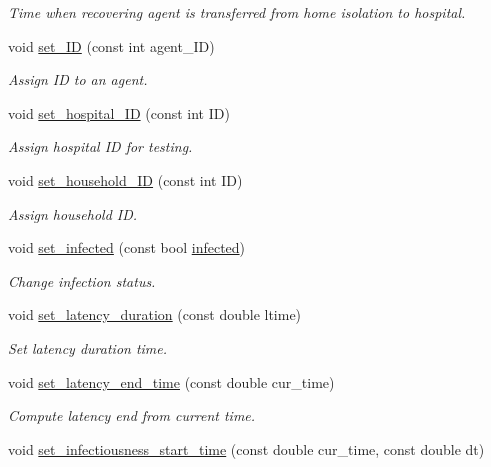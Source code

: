 \begin{DoxyCompactItemize}
\begin{DoxyCompactList}\small\item\em Time when recovering agent is transferred from home isolation to hospital. \end{DoxyCompactList}\item 
void \hyperlink{classAgent_a2820049e7b8d498e5fb5047ca2a05d63}{set\+\_\+\+ID} (const int agent\+\_\+\+ID)
\begin{DoxyCompactList}\small\item\em Assign ID to an agent. \end{DoxyCompactList}\item 
void \hyperlink{classAgent_acd018fbc754c1a7a6b2a8cdf05455c6c}{set\+\_\+hospital\+\_\+\+ID} (const int ID)
\begin{DoxyCompactList}\small\item\em Assign hospital ID for testing. \end{DoxyCompactList}\item 
void \hyperlink{classAgent_a2b889b74bbe8a1c8754c3211892a761b}{set\+\_\+household\+\_\+\+ID} (const int ID)
\begin{DoxyCompactList}\small\item\em Assign household ID. \end{DoxyCompactList}\item 
void \hyperlink{classAgent_a97a65be4ac76ba2650f8e4ea136dc3d7}{set\+\_\+infected} (const bool \hyperlink{classAgent_abb85f9353fdaa27e69606b3c1e8fa364}{infected})
\begin{DoxyCompactList}\small\item\em Change infection status. \end{DoxyCompactList}\item 
void \hyperlink{classAgent_a3f8ddc8e37400ca8f37705248e61d328}{set\+\_\+latency\+\_\+duration} (const double ltime)
\begin{DoxyCompactList}\small\item\em Set latency duration time. \end{DoxyCompactList}\item 
void \hyperlink{classAgent_a0c99e711b0685c67da58a87556380931}{set\+\_\+latency\+\_\+end\+\_\+time} (const double cur\+\_\+time)
\begin{DoxyCompactList}\small\item\em Compute latency end from current time. \end{DoxyCompactList}\item 
void \hyperlink{classAgent_a151d7b2962d5238ff071c278455776e9}{set\+\_\+infectiousness\+\_\+start\+\_\+time} (const double cur\+\_\+time, const double dt)

\end{DoxyCompactItemize}
